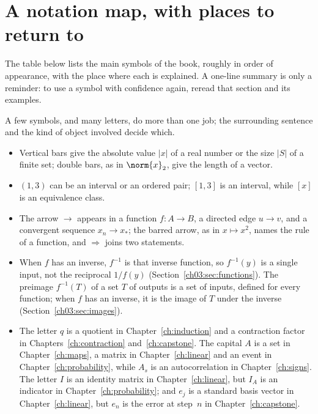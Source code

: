 \section{A notation map, with places to return to}\label{appE:sec:notation}
The table below lists the main symbols of the book, roughly in order of appearance, with the place where each is explained. A one-line summary is only a reminder: to use a symbol with confidence again, reread that section and its examples.

A few symbols, and many letters, do more than one job; the surrounding sentence and the kind of object involved decide which.
\begin{itemize}
\item Vertical bars give the absolute value $|x|$ of a real number or the size $|S|$ of a finite set; double bars, as in $\norm{x}_2$, give the length of a vector.
\item $(1,3)$ can be an interval or an ordered pair; $[1,3]$ is an interval, while $[x]$ is an equivalence class.
\item The arrow $\to$ appears in a function $f:A\to B$, a directed edge $u\to v$, and a convergent sequence $x_n\to x_*$; the barred arrow, as in $x\mapsto x^2$, names the rule of a function, and $\Rightarrow$ joins two statements.
\item When $f$ has an inverse, $f^{-1}$ is that inverse function, so $f^{-1}(y)$ is a single input, not the reciprocal $1/f(y)$ (Section~\ref{ch03:sec:functions}). The preimage $f^{-1}(T)$ of a set $T$ of outputs is a set of inputs, defined for every function; when $f$ has an inverse, it is the image of $T$ under the inverse (Section~\ref{ch03:sec:images}).
\item The letter $q$ is a quotient in Chapter~\ref{ch:induction} and a contraction factor in Chapters~\ref{ch:contraction} and~\ref{ch:capstone}. The capital $A$ is a set in Chapter~\ref{ch:maps}, a matrix in Chapter~\ref{ch:linear} and an event in Chapter~\ref{ch:probability}, while $A_s$ is an autocorrelation in Chapter~\ref{ch:signs}. The letter $I$ is an identity matrix in Chapter~\ref{ch:linear}, but $I_A$ is an indicator in Chapter~\ref{ch:probability}; and $e_j$ is a standard basis vector in Chapter~\ref{ch:linear}, but $e_n$ is the error at step~$n$ in Chapter~\ref{ch:capstone}.
\end{itemize}


